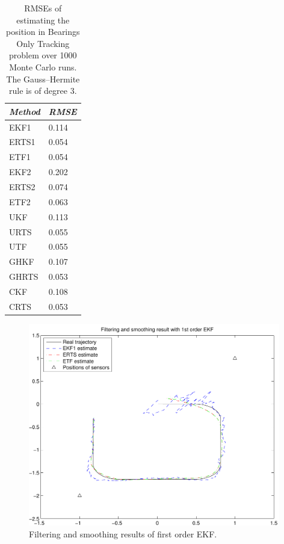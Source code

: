\begin{table}
\begin{center}
\begin{tabular}{|l|l|} \hline {\it Method}&{\it RMSE } \\ \hline 
  EKF1  & 0.114 \\ 
  ERTS1 & 0.054 \\ 
  ETF1  & 0.054 \\ 
  EKF2  & 0.202 \\ 
  ERTS2 & 0.074 \\ 
  ETF2  & 0.063 \\ 
  UKF   & 0.113 \\ 
  URTS  & 0.055 \\ 
  UTF   & 0.055 \\
  GHKF  & 0.107 \\
  GHRTS & 0.053 \\
  CKF   & 0.108 \\
  CRTS  & 0.053 \\
\hline
\end{tabular}
\caption{RMSEs of estimating the position in Bearings Only Tracking
problem over 1000 Monte Carlo runs. The Gauss--Hermite rule is of degree 3.}
\label{table:bot_rmse}
\end{center}
\end{table}

%
\begin{figure}
\begin{center}
\includegraphics[width=11cm]{pics/bot_demo_ekf1}
\caption{Filtering and smoothing results of first order EKF.}
\label{fig:bot_ekf1}
\end{center}
\end{figure}

